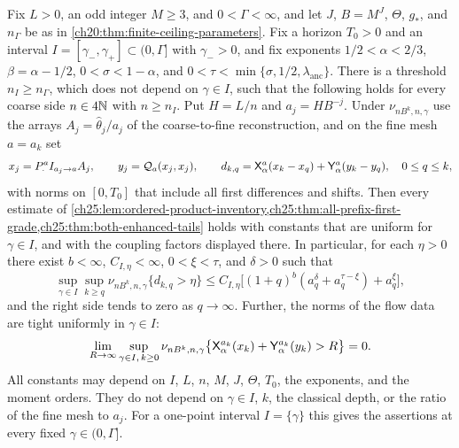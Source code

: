 \begin{lemma}\label{ch25:lem:finite-ceiling-finite-mesh-estimates}
Fix $L>0$, an odd integer $M\ge3$, and $0<\Gamma<\infty$, and let $J$, $B=M^J$, $\Theta$, $g_*$, and $n_\Gamma$ be as in \cref{ch20:thm:finite-ceiling-parameters}. Fix a horizon $T_0>0$ and an interval $I=[\gamma_-,\gamma_+]\subset(0,\Gamma]$ with $\gamma_->0$, and fix exponents $1/2<\alpha<2/3$, $\beta=\alpha-1/2$, $0<\sigma<1-\alpha$, and $0<\tau<\min\{\sigma,1/2,\lambda_{\mathrm{anc}}\}$. There is a threshold $n_I\ge n_\Gamma$, which does not depend on $\gamma\in I$, such that the following holds for every coarse side $n\in4\mathbb N$ with $n\ge n_I$. Put $H=L/n$ and $a_j=HB^{-j}$. Under $\nu_{nB^k,n,\gamma}$ use the arrays $A_j=\widehat\theta_j/a_j$ of the coarse-to-fine reconstruction, and on the fine mesh $a=a_k$ set
\[
 x_j=P_\cdot^aI_{a_j\to a}A_j,\qquad y_j=\mathcal Q_{a}(x_j,x_j),\qquad
 d_{k,q}=\mathsf X_{\alpha}^{a}(x_k-x_q)+\mathsf Y_{\alpha}^{a}(y_k-y_q),\quad 0\le q\le k,
\]
with norms on $[0,T_0]$ that include all first differences and shifts. Then every estimate of \cref{ch25:lem:ordered-product-inventory,ch25:thm:all-prefix-first-grade,ch25:thm:both-enhanced-tails} holds with constants that are uniform for $\gamma\in I$, and with the coupling factors displayed there. In particular, for each $\eta>0$ there exist $b<\infty$, $C_{I,\eta}<\infty$, $0<\xi<\tau$, and $\delta>0$ such that
\begin{equation}\label{ch25:eq:finite-ceiling-compact-tail}
 \sup_{\gamma\in I}\sup_{k\ge q}\nu_{nB^k,n,\gamma}\{d_{k,q}>\eta\}\le C_{I,\eta}\bigl[(1+q)^b(a_q^\delta+a_q^{\tau-\xi})+a_q^\xi\bigr],
\end{equation}
and the right side tends to zero as $q\to\infty$. Further, the norms of the flow data are tight uniformly in $\gamma\in I$:
\begin{equation}\label{ch25:eq:finite-ceiling-radius-tightness}
 \lim_{R\to\infty}\sup_{\gamma\in I,\,k\ge0}\nu_{nB^k,n,\gamma}\bigl\{\mathsf X_{\alpha}^{a_k}(x_k)+\mathsf Y_{\alpha}^{a_k}(y_k)>R\bigr\}=0.
\end{equation}
All constants may depend on $I$, $L$, $n$, $M$, $J$, $\Theta$, $T_0$, the exponents, and the moment orders. They do not depend on $\gamma\in I$, $k$, the classical depth, or the ratio of the fine mesh to $a_j$. For a one-point interval $I=\{\gamma\}$ this gives the assertions at every fixed $\gamma\in(0,\Gamma]$.
\end{lemma}

